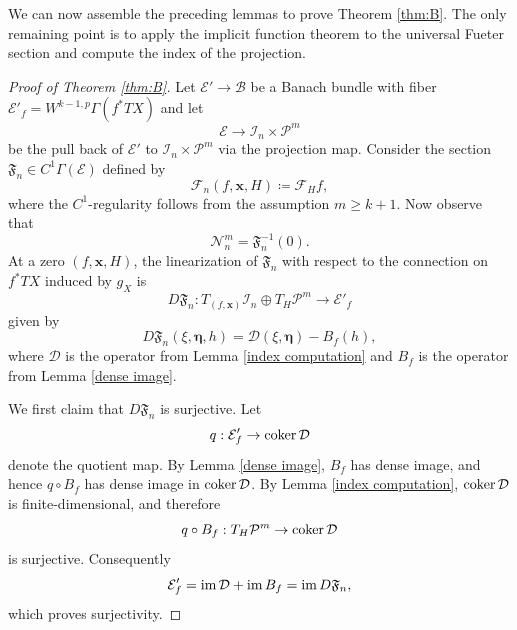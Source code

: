 \documentclass[11pt,a4paper]{article}
\theoremstyle{definition}
\newcommand{\im}{\textnormal{im\,}}
\newcommand{\coker}{\textnormal{coker\,}}
\newcommand{\fF}{\mathfrak{F}}
\newcommand{\cE}{\mathcal{E}}
\newcommand{\cD}{\mathcal{D}}
\newcommand{\cF}{\mathcal{F}}
\newcommand{\cI}{\mathcal{I}}
\newcommand{\cP}{\mathcal{P}}
\newcommand{\cN}{\mathcal{N}}
\newcommand{\cB}{\mathcal{B}}
\newcommand{\bx}{\mathbf{x}}
\begin{document}
We can now assemble the preceding lemmas to prove Theorem \ref{thm:B}. The only remaining point is to apply the implicit function theorem to the universal Fueter section and compute the index of the projection.

\begin{proof}[Proof of Theorem \ref{thm:B}]
  Let $\cE' \to \cB$ be a Banach bundle with fiber $\cE'_f = W^{k-1, p}\Gamma(f^*TX)$ and let
  \begin{equation*}
    \cE \to \cI_n \times \cP^m
  \end{equation*}
  be the pull back of $\cE'$ to $\cI_n \times \cP^m$ via the projection map. Consider the section $\fF_n \in C^1 \Gamma(\cE)$ defined by
  \begin{equation*}
    \cF_n(f, \bx, H) \coloneq \cF_H f,
  \end{equation*}
  where the $C^1$-regularity follows from the assumption $m\geq k+1$. Now observe that
  \begin{equation*}
    \cN^m_n = \fF^{-1}_n(0).
  \end{equation*}
  At a zero $(f, \bx, H)$, the linearization of $\fF_n$ with respect to the connection on $f^*TX$ induced by $g_X$ is
  \begin{equation*}
    D\fF_n: T_{(f, \bx)} \cI_n \oplus T_H \cP^m \to \cE'_f
  \end{equation*}
  given by
  \begin{equation*}
    D\fF_n(\xi, \bm{\eta}, h) = \cD(\xi, \bm{\eta}) - B_f(h),
  \end{equation*}
  where $\cD$ is the operator from Lemma \ref{index computation} and $B_f$ is the operator from Lemma \ref{dense image}.
  
  We first claim that $D\fF_n$ is surjective. Let 
  \begin{equation*}
    q: \cE'_f \to \coker \cD
  \end{equation*}
  denote the quotient map. By Lemma \ref{dense image}, $B_f$ has dense image, and hence $q \circ B_f$ has dense image in $\coker \cD$. By Lemma \ref{index computation}, $\coker \cD$ is finite-dimensional, and therefore 
  \begin{equation*}
    q \circ B_f : T_H \cP^m \to \coker \cD
  \end{equation*}
  is surjective. Consequently
  \begin{equation*}
    \cE'_f = \im \cD + \im B_f = \im D\fF_n,
  \end{equation*}
  which proves surjectivity.


\end{proof}
\end{document}

